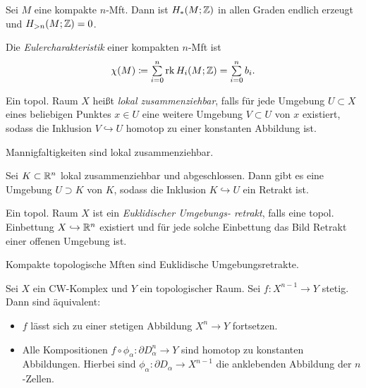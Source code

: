 \documentclass{cheat-sheet}
\DeclareMathOperator{\rk}{rk} %
\begin{document}
\begin{satz}
  Sei $M$ eine kompakte $n$-Mft. Dann ist $H_*(M;\mathbb{Z})$ in allen Graden endlich erzeugt und $H_{>n}(M; \mathbb{Z}) = 0$.
\end{satz}

\begin{defn}
  Die \emph{Eulercharakteristik} einer kompakten $n$-Mft ist
  \[ \chi(M) \coloneqq \sum_{i=0}^n \rk H_i(M; \Z) = \sum_{i=0}^n b_i. \]
\end{defn}

\begin{defn}
  Ein topol. Raum $X$ heißt \emph{lokal zusammenziehbar}, falls für jede Umgebung $U \subset X$ eines beliebigen Punktes $x \in U$ eine weitere Umgebung $V \subset U$ von $x$ existiert, sodass die Inklusion $V \hookrightarrow U$ homotop zu einer konstanten Abbildung ist.
\end{defn}

\begin{lem}
  Mannigfaltigkeiten sind lokal zusammenziehbar.
\end{lem}

\begin{satz}
  Sei $K \subset \mathbb{R}^n$ lokal zusammenziehbar und abgeschlossen. Dann gibt es eine Umgebung $U \supset K$ von $K$, sodass die Inklusion $K \hookrightarrow U$ ein Retrakt ist.
\end{satz}

\begin{defn}
  Ein topol. Raum $X$ ist ein \emph{Euklidischer Umgebungs- retrakt}, falls eine topol. Einbettung $X \hookrightarrow \mathbb{R}^n$ existiert und für jede solche Einbettung das Bild Retrakt einer offenen Umgebung ist.
\end{defn}

\begin{kor}
  Kompakte topologische Mften sind Euklidische Umgebungsretrakte.
\end{kor}

\begin{prop}
  Sei $X$ ein CW-Komplex und $Y$ ein topologischer Raum. Sei $f : X^{n-1} \to Y$ stetig. Dann sind äquivalent:
  \begin{itemize}
    \item $f$ lässt sich zu einer stetigen Abbildung $X^n \to Y$ fortsetzen.
    \item Alle Kompositionen $f \circ \phi_\alpha : \partial D_\alpha^n \to Y$ sind homotop zu konstanten Abbildungen. Hierbei sind $\phi_\alpha : \partial D_\alpha \to X^{n-1}$ die anklebenden Abbildung der $n$-Zellen.
  \end{itemize}
\end{prop}
\end{document}
